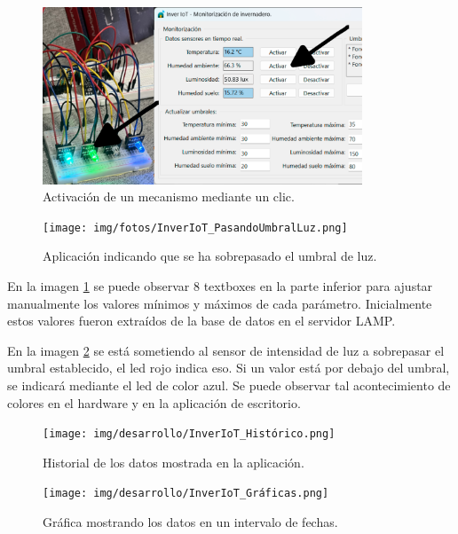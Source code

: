 \begin{figure}[h]
	\centering
	\includegraphics[width=0.85\textwidth]{img/desarrollo/InverIoT_verde_clickMecanismo.png}
	\caption{Activación de un mecanismo mediante un clic.}\label{img:InverIoTBotones}
\end{figure}

\begin{figure}[h]
	\centering
	\texttt{[image: img/fotos/InverIoT\_PasandoUmbralLuz.png]}
	\caption{Aplicación indicando que se ha sobrepasado el umbral de luz.}\label{img:InverIoTPasandoUmbralLuz}
\end{figure}

En la imagen \ref{img:InverIoTBotones} se puede observar 8 textboxes en la parte inferior para ajustar manualmente los valores mínimos y máximos de cada parámetro. Inicialmente estos valores fueron extraídos de la base de datos en el servidor LAMP.

En la imagen \ref{img:InverIoTPasandoUmbralLuz} se está sometiendo al sensor de intensidad de luz a sobrepasar el umbral establecido, el led rojo indica eso. Si un valor está por debajo del umbral, se indicará mediante el led de color azul. Se puede observar tal acontecimiento de colores en el hardware y en la aplicación de escritorio.

\begin{figure}[h]
    \centering
    \texttt{[image: img/desarrollo/InverIoT\_Histórico.png]}
    \caption{Historial de los datos mostrada en la aplicación.}
\end{figure}


\begin{figure}[h]
    \centering
    \texttt{[image: img/desarrollo/InverIoT\_Gráficas.png]}
    \caption{Gráfica mostrando los datos en un intervalo de fechas.}
\end{figure}




\pagebreak


